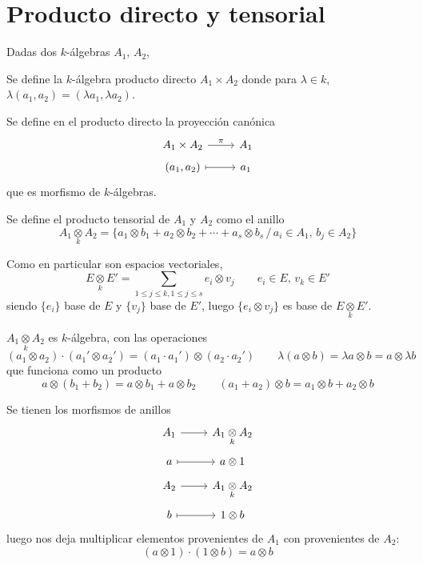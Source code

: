     \section{Producto directo y tensorial}
    Dadas dos $k$-\'algebras $A_1,\, A_2$, 
    \begin{defi}
        Se define la $k$-\'algebra producto directo $A_1 \times A_2$ donde para $\lambda \in k$, $\lambda(a_1,a_2) = (\lambda a_1, \lambda a_2)$.
    \end{defi}
    \begin{defi}
        Se define en el producto directo la proyecci\'on can\'onica
        $$\bt A_1 \times A_2 \rar{\pi} & A_1\\[-5mm] (a_1,a_2) \rarmaps & a_1 \et$$
        que es morfismo de $k$-\'algebras.
    \end{defi}
    \begin{defi}
        Se define el producto tensorial de $A_1$ y $A_2$ como el anillo
        $$A_1 \underset{k}{\otimes} A_2 = \{a_1 \otimes b_1 + a_2 \otimes b_2 + \cdots + a_s\otimes b_s \, / \, a_i \in A_1, \, b_j \in A_2 \}$$
    \end{defi}
    \begin{obs}
        Como en particular son espacios vectoriales,
        $$E \underset{k}{\otimes} E' = \sum_{1 \leq j \leq k, 1\leq j \leq s} e_i \otimes v_j \qquad e_i \in E, \, v_k \in E'$$
        siendo $\{e_i\}$ base de $E$ y $\{v_j\}$ base de $ E'$, luego $\{e_i \otimes v_j\}$ es base de $E \underset{k}{\otimes} E'$.
    \end{obs}
    \begin{prop}
        $A_1 \underset{k}{\otimes} A_2$ es $k$-\'algebra, con las operaciones
        $$(a_1 \otimes a_2) \cdot (a_1' \otimes a_2') = (a_1 \cdot a_1') \otimes (a_2 \cdot a_2') \qquad \lambda (a\otimes b) = \lambda a \otimes  b = a \otimes \lambda b$$
        que funciona como un producto
        $$a\otimes (b_1+ b_2) = a\otimes b_1 + a \otimes b_2 \qquad (a_1 + a_2) \otimes b = a_1\otimes b + a_2\otimes b$$
    \end{prop}
    \begin{defi}
        Se tienen los morfismos de anillos
        $$\bt A_1 \rar & A_1 \underset{k}{\otimes} A_2 \\[-5mm] a \rarmaps & a\otimes 1 \et$$
        $$\bt A_2 \rar & A_1 \underset{k}{\otimes} A_2 \\[-5mm] b \rarmaps & 1\otimes b \et$$
        luego nos deja multiplicar elementos provenientes de $A_1$ con provenientes de $A_2$:
        $$(a\otimes 1) \cdot (1 \otimes b) = a\otimes b$$
    \end{defi}
